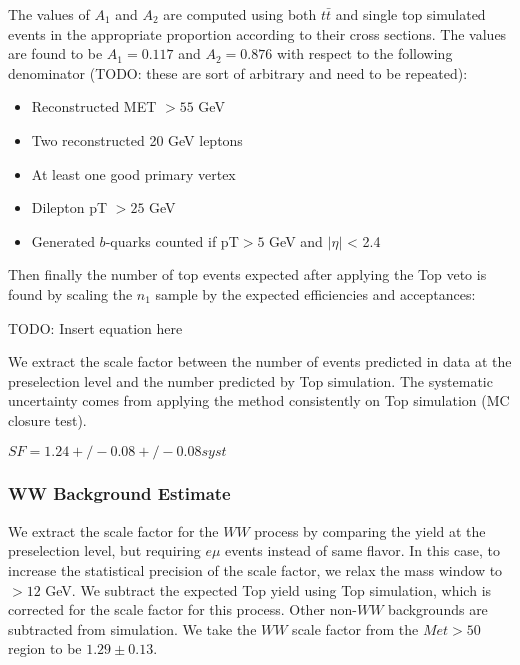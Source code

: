 The values of $A_1$ and $A_2$ are computed using both $t\bar{t}$ and single top simulated events
in the appropriate proportion according to their cross sections. The values are found to be
$A_1=0.117$ and $A_2=0.876$ with respect to the following denominator 
(TODO: these are sort of arbitrary and need to be repeated):

\begin{itemize}
    \item Reconstructed MET $> 55$ GeV
    \item Two reconstructed 20 GeV leptons
    \item At least one good primary vertex
    \item Dilepton pT $> 25$ GeV
    \item Generated $b$-quarks counted if pT$>5$ GeV and $|\eta|$ < 2.4
\end{itemize}

Then finally the number of top events expected after applying the Top veto is found
by scaling the $n_{1}$ sample by the expected efficiencies and acceptances:

TODO: Insert equation here

We extract the scale factor between the number of events predicted in data at the 
preselection level and the number predicted by Top simulation.
The systematic uncertainty comes from applying the method consistently on
Top simulation (MC closure test).

$SF = 1.24 +/- 0.08 +/- 0.08 syst$

\subsubsection{WW Background Estimate}

We extract the scale factor for the $WW$ process by comparing the
yield at the preselection level, but requiring $e\mu$ events instead
of same flavor. 
In this case, to increase the statistical precision of the scale factor,
we relax the mass window to $>12$ GeV.
We subtract the expected Top yield using Top simulation, which is 
corrected for the scale factor for this process.  Other non-$WW$
backgrounds are subtracted from simulation.
We take the $WW$ scale factor from the $Met>50$ region
to be $1.29 \pm 0.13$.

